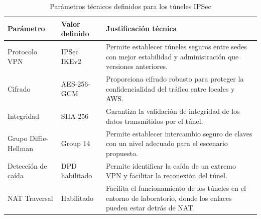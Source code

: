 \documentclass[11pt, a4paper, oneside]{report}
\begin{document}
\begin{table}[H]
  \centering
  \renewcommand{\arraystretch}{1.3}
  \footnotesize

  \begin{tabularx}{0.95\textwidth}{@{}|L{3cm}|L{3.5cm}|X|@{}}

    \parbox[c][1.1cm][c]{\linewidth}{\centering\color{white}\bfseries\small Parámetro} &
    \parbox[c][1.1cm][c]{\linewidth}{\centering\color{white}\bfseries\small Valor definido} &
    \parbox[c][1.1cm][c]{\linewidth}{\centering\color{white}\bfseries\small Justificación técnica} \\ \hline

    {\small Protocolo VPN} &
    {\small IPSec IKEv2} &
    {\small Permite establecer túneles seguros entre sedes con mejor estabilidad y administración que versiones anteriores.} \\ \hline

    {\small Cifrado} &
    {\small AES-256-GCM} &
    {\small Proporciona cifrado robusto para proteger la confidencialidad del tráfico entre locales y AWS.} \\ \hline

    {\small Integridad} &
    {\small SHA-256} &
    {\small Garantiza la validación de integridad de los datos transmitidos por el túnel.} \\ \hline

    {\small Grupo Diffie-Hellman} &
    {\small Group 14} &
    {\small Permite establecer intercambio seguro de claves con un nivel adecuado para el escenario propuesto.} \\ \hline

    {\small Detección de caída} &
    {\small DPD habilitado} &
    {\small Permite identificar la caída de un extremo VPN y facilitar la reconexión del túnel.} \\ \hline

    {\small NAT Traversal} &
    {\small Habilitado} &
    {\small Facilita el funcionamiento de los túneles en el entorno de laboratorio, donde los enlaces pueden estar detrás de NAT.} \\ \hline

  \end{tabularx}

  \caption{Parámetros técnicos definidos para los túneles IPSec}
  \label{tab:parametros_ipsec}
\end{table}
\end{document}
